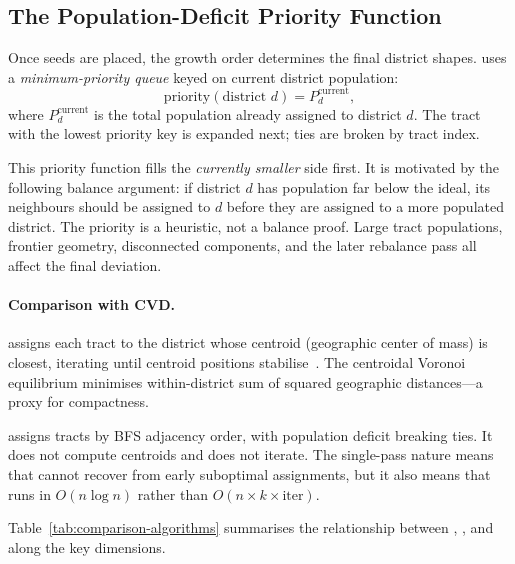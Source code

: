 \subsection{The Population-Deficit Priority Function}

Once seeds are placed, the growth order determines the final district shapes.
\bfsg{} uses a \emph{minimum-priority queue} keyed on current district
population:
\[
  \text{priority}(\text{district } d) = P_d^{\mathrm{current}},
\]
where $P_d^{\mathrm{current}}$ is the total population already assigned
to district $d$.
The tract with the lowest priority key is expanded next; ties are broken
by tract index.

This priority function fills the \emph{currently smaller} side first.
It is motivated by the following balance argument: if district $d$ has
population far below the ideal, its neighbours should be assigned to $d$
before they are assigned to a more populated district.
The priority is a heuristic, not a balance proof. Large tract populations,
frontier geometry, disconnected components, and the later rebalance pass all
affect the final deviation.

\paragraph{Comparison with CVD.}
\cvd{} assigns each tract to the district whose centroid (geographic center
of mass) is closest, iterating until centroid positions stabilise~\citep{du1999}.
The centroidal Voronoi equilibrium minimises within-district sum of squared
geographic distances---a proxy for compactness.

\bfsg{} assigns tracts by BFS adjacency order, with population deficit
breaking ties.
It does not compute centroids and does not iterate.
The single-pass nature means that \bfsg{} cannot recover from early
suboptimal assignments, but it also means that \bfsg{} runs in $O(n \log n)$
rather than $O(n \times k \times \text{iter})$.

Table~\ref{tab:comparison-algorithms} summarises the relationship between
\bfsg{}, \cvd{}, and \metis{} along the key dimensions.

